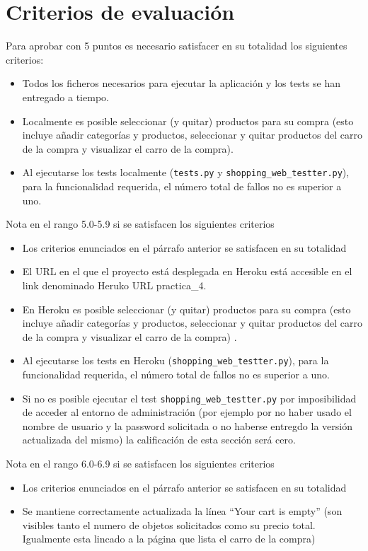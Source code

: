 \documentclass[12pt]{article} %
\newcommand{\ttt}[1]{\texttt{#1}}%
\begin{document}
\section{Criterios de evaluación}

Para aprobar con 5 puntos es necesario satisfacer en su totalidad los siguientes criterios:
\begin{itemize}
 \item Todos los ficheros necesarios para ejecutar la aplicación y los tests se han entregado a tiempo.
 \item Localmente es posible seleccionar (y quitar) productos para su  compra (esto incluye añadir categorías y productos, seleccionar y quitar productos del carro de la compra y visualizar el carro de la compra).
 \item Al ejecutarse los tests localmente (\ttt{tests.py} y \ttt{shopping\_web\_testter.py}), para la funcionalidad requerida, el número total de fallos no es superior a uno.
\end{itemize}
 
Nota en el rango 5.0-5.9 si se satisfacen los siguientes criterios
 \begin{itemize}
 \item Los criterios enunciados en el párrafo anterior se satisfacen en su totalidad 
 \item El URL en el que el proyecto está desplegada en Heroku está accesible en el link denominado Heruko URL practica\_4.
 \item En Heroku es posible seleccionar (y quitar) productos para su  compra (esto incluye añadir categorías y productos, seleccionar y quitar productos del carro de la compra y visualizar el carro de la compra) .
 \item Al ejecutarse los tests en Heroku (\ttt{shopping\_web\_testter.py}), para la funcionalidad requerida, el número total de fallos no es superior a uno. 
 \item Si no es posible ejecutar el test \ttt{shopping\_web\_testter.py} por imposibilidad de acceder al entorno de administración (por ejemplo por no haber usado el nombre de usuario y la password solicitada o no haberse entregdo la versión actualizada del mismo) la calificación de esta sección será cero.
\end{itemize}
 
Nota en el rango 6.0-6.9 si se satisfacen los siguientes criterios
 \begin{itemize}
 \item Los criterios enunciados en el párrafo anterior se satisfacen en su totalidad 
 \item Se mantiene correctamente actualizada la línea ``Your cart is empty'' (son visibles tanto el numero de objetos solicitados como su precio total. Igualmente esta lincado a la página que lista el carro de la compra)
 \end{itemize}
 
\end{document}
